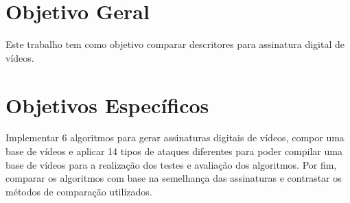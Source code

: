    








\section{Objetivo Geral}
Este trabalho tem como objetivo comparar descritores para assinatura digital de vídeos.

\section{Objetivos Específicos}

Implementar 6 algoritmos para gerar assinaturas digitais de vídeos, compor uma base de vídeos e aplicar 14 tipos de ataques diferentes para poder compilar uma base de vídeos para a realização dos testes e avaliação dos algoritmos. Por fim, comparar os algoritmos com base na semelhança das assinaturas e contrastar os métodos de comparação utilizados.















